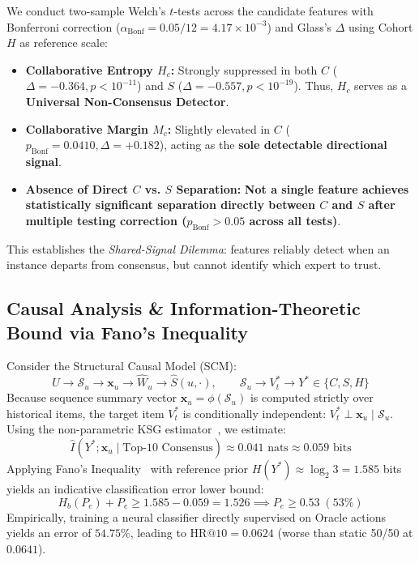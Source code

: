 We conduct two-sample Welch's $t$-tests across the candidate features with Bonferroni correction ($\alpha_{\text{Bonf}} = 0.05/12 = 4.17 \times 10^{-3}$) and Glass's $\Delta$ using Cohort $H$ as reference scale:
\begin{itemize}[leftmargin=*]
    \item \textbf{Collaborative Entropy $H_c$:} Strongly suppressed in both $C$ ($\Delta = -0.364, p < 10^{-11}$) and $S$ ($\Delta = -0.557, p < 10^{-19}$). Thus, $H_c$ serves as a \textbf{Universal Non-Consensus Detector}.
    \item \textbf{Collaborative Margin $M_c$:} Slightly elevated in $C$ ($p_{\text{Bonf}} = 0.0410, \Delta = +0.182$), acting as the \textbf{sole detectable directional signal}.
    \item \textbf{Absence of Direct $C$ vs. $S$ Separation:} \textbf{Not a single feature achieves statistically significant separation directly between $C$ and $S$ after multiple testing correction ($p_{\text{Bonf}} > 0.05$ across all tests)}.
\end{itemize}
This establishes the \emph{Shared-Signal Dilemma}: features reliably detect when an instance departs from consensus, but cannot identify which expert to trust.

\subsection{Causal Analysis \& Information-Theoretic Bound via Fano's Inequality}
\label{sec:fano}

Consider the Structural Causal Model (SCM):
\begin{equation}
    U \longrightarrow \mathcal{S}_u \longrightarrow \mathbf{x}_u \longrightarrow \hat{W}_u \longrightarrow \hat{S}(u, \cdot), \qquad \mathcal{S}_u \longrightarrow V_t^* \longrightarrow Y^* \in \{C, S, H\}
\end{equation}
Because sequence summary vector $\mathbf{x}_u = \phi(\mathcal{S}_u)$ is computed strictly over historical items, the target item $V_t^*$ is conditionally independent: $V_t^* \perp \mathbf{x}_u \mid \mathcal{S}_u$.
Using the non-parametric KSG estimator~\cite{kraskov2004estimating}, we estimate:
\begin{equation}
    \hat{I}(Y^* ; \mathbf{x}_u \mid \text{Top-10 Consensus}) \approx 0.041 \text{ nats} \approx 0.059 \text{ bits}
\end{equation}
Applying Fano's Inequality~\cite{fano1961transmission} with reference prior $H(Y^*) \approx \log_2 3 = 1.585$ bits yields an indicative classification error lower bound:
\begin{equation}
    H_b(P_e) + P_e \ge 1.585 - 0.059 = 1.526 \implies P_e \ge \mathbf{0.53} \; (53\%)
\end{equation}
Empirically, training a neural classifier directly supervised on Oracle actions yields an error of \textbf{$54.75\%$}, leading to $\text{HR@10} = 0.0624$ (worse than static 50/50 at $0.0641$).

